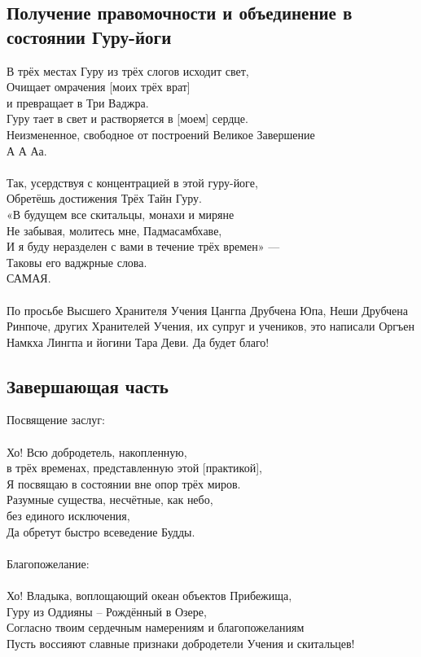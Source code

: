 \subsection*{Получение правомочности и объединение в состоянии Гуру-йоги}
В трёх местах Гуру из трёх слогов исходит свет,\\
Очищает омрачения [моих трёх врат] \\ \indent и превращает в Три Ваджра.\\
Гуру тает в свет и растворяется в [моем] сердце.\\
Неизмененное, свободное от построений Великое Завершение\\
\indent А А Аа.\\
\\
\scriptsize
Так, усердствуя с концентрацией в этой гуру-йоге,\\
Обретёшь достижения Трёх Тайн Гуру.\\
«В будущем все скитальцы, монахи и миряне\\
Не забывая, молитесь мне, Падмасамбхаве,\\
И я буду неразделен с вами в течение трёх времен» —\\
Таковы его ваджрные слова.\\
САМАЯ.\\
\\
По просьбе Высшего Хранителя Учения Цангпа Друбчена Юпа,
Неши Друбчена Ринпоче, других Хранителей Учения, их супруг и учеников,
это написали Оргъен Намкха Лингпа и йогини Тара Деви. Да будет благо!
\normalsize

\subsection{Завершающая часть}

\scriptsize
Посвящение заслуг:\\
\normalsize
\\
Хо! Всю добродетель, накопленную, \\
\indent в трёх временах, представленную этой [практикой],\\
Я посвящаю в состоянии вне опор трёх миров.\\
Разумные существа, несчётные, как небо, \\
\indent без единого исключения,\\
Да обретут быстро всеведение Будды.\\
\\

\scriptsize
Благопожелание:\\
\normalsize
\\
Хо! Владыка, воплощающий океан объектов Прибежища,\\
Гуру из Оддияны – Рождённый в Озере,\\
Согласно твоим сердечным намерениям и благопожеланиям\\
Пусть воссияют славные признаки добродетели Учения и скитальцев!\\

